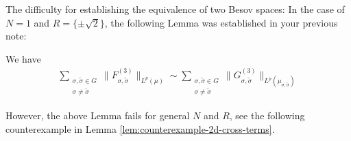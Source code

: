 \documentclass[12pt]{amsart}
\begin{document}
{\color{red} The difficulty for establishing the equivalence of two Besov spaces: In the case of $N=1$ and $R=\{\pm\sqrt{2}\}$, the following Lemma was established in your previous note:
\begin{lemma}
We have
\begin{align*}
\sum_{\substack{\sigma,\tilde{\sigma}\in G\\ \sigma\neq \tilde{\sigma}}}\|F_{\sigma,\tilde{\sigma}}^{(3)}\|_{L^p(\mu)}\sim\sum_{\substack{\sigma,\tilde{\sigma}\in G\\ \sigma\neq \tilde{\sigma}}}
\|G_{\sigma,\tilde{\sigma}}^{(3)}\|_{L^p(\mu_{\sigma,\tilde{\sigma}})}
\end{align*}
\end{lemma}%
%
%
%
%
However, the above Lemma fails for general $N$ and $R$, see the following counterexample in Lemma \ref{lem:counterexample-2d-cross-terms}.
}
\end{document}

